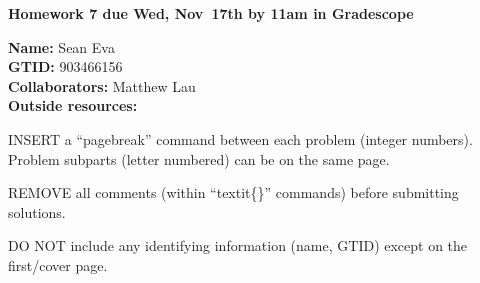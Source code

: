 \documentclass[11pt]{article}
\begin{document}
{\noindent\Large\textbf{Homework 7 due Wed, Nov~17th by 11am in Gradescope}}

\vspace{.25in}

{\large
\noindent
\textbf{Name:} Sean Eva\smallskip \\
\textbf{GTID:} 903466156\smallskip \\
\textbf{Collaborators:} Matthew Lau\smallskip \\
\textbf{Outside resources:} \smallskip
}

\pagebreak 


INSERT a ``pagebreak'' command between each problem (integer numbers).
Problem subparts (letter numbered) can be on the same page.

REMOVE all comments (within ``textit\{\}'' commands) before submitting
solutions.

DO NOT include any identifying information (name, GTID) except on the
first/cover page.
\end{document}

